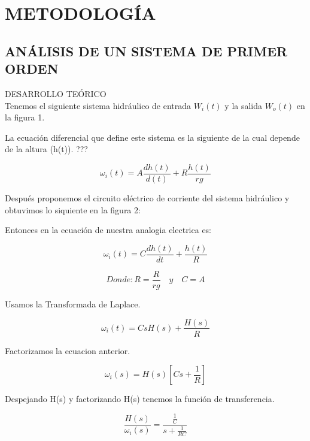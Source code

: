 \documentclass{report}
\newcounter{ns}
\begin{document}
	
			
		\chapter*{METODOLOGÍA}
	\section{ANÁLISIS DE UN SISTEMA DE PRIMER ORDEN}
	
	DESARROLLO TEÓRICO\\
	
	Tenemos el siguiente sistema hidráulico de entrada $W_i (t)$ y la salida $W_o (t)$ en la figura 1.
	
	

	La ecuación diferencial que define este sistema es la siguiente de la cual depende de la altura (h(t)). ???
	
	\begin{equation*}
		\omega_i(t)=A\frac{dh(t)}{d(t)}+R\frac{h(t)}{rg}
	\end{equation*}
	
	Después proponemos el circuito eléctrico de corriente del sistema hidráulico y obtuvimos lo siquiente en la figura 2:
	
	
	 
	Entonces en la ecuación de nuestra analogia electrica es:
	
	\begin{equation*}
		 \omega_i(t)=C\frac{dh(t)}{dt}+\frac{h(t)}{R}
	\end{equation*}
	
	\begin{equation*}
		Donde:	R=\frac{R}{rg}\quad y \quad C=A
	\end{equation*}
	
	Usamos la Transformada de Laplace.
	
	\begin{equation*}
		\omega_i(t)=CsH(s) + \frac{H(s)}{R}
	\end{equation*}
	
	Factorizamos la ecuacion anterior.
	
	\begin{equation*}
		\omega_i(s)=H(s) \left[Cs+\frac{1}{R}\right]
	\end{equation*}
	
	Despejando H(s) y factorizando H(s) tenemos la función de transferencia.
	
	\begin{equation*}
		\frac{H(s)}{\omega_i(s)}=\frac{\frac{1}{C}}{s+\frac{1}{RC}}
	\end{equation*}
	
\end{document}

